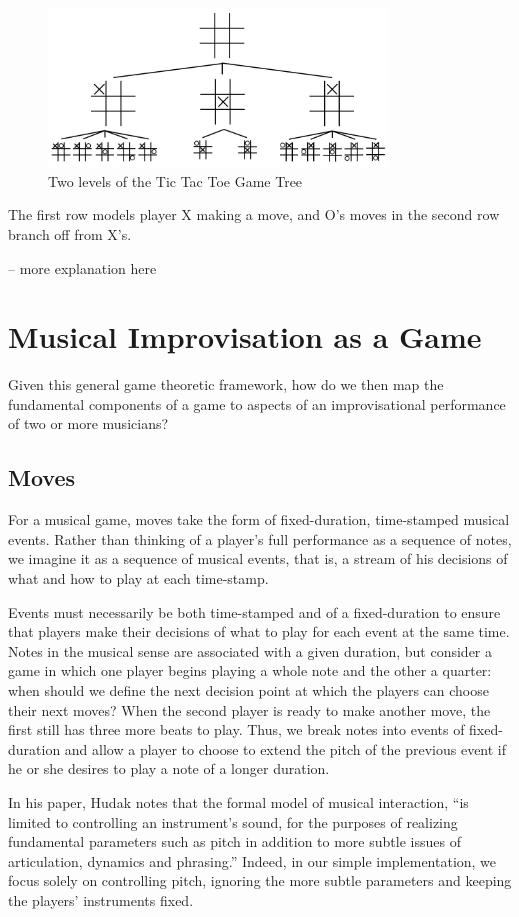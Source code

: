 \documentclass{article}
\begin{document}
\begin{figure}
\centering
\includegraphics[width=90mm]{ttt.jpg}
\caption{Two levels of the Tic Tac Toe Game Tree}
\end{figure}

The first row models player X making a move, and O's moves in the second
row branch off from X's.

-- more explanation here

\section{Musical Improvisation as a
Game}

Given this general game theoretic framework, how do we then map the
fundamental components of a game to aspects of an improvisational
performance of two or more musicians?

\subsection{Moves}
For a musical game, moves take the form of fixed-duration, time-stamped
musical events. Rather than thinking of a player's full performance as a
sequence of notes, we imagine it as a sequence of musical events, that
is, a stream of his decisions of what and how to play at each
time-stamp.

Events must necessarily be both time-stamped and of a fixed-duration to
ensure that players make their decisions of what to play for each event
at the same time. Notes in the musical sense are associated with a given
duration, but consider a game in which one player begins playing a whole
note and the other a quarter: when should we define the next decision
point at which the players can choose their next moves? When the second
player is ready to make another move, the first still has three more
beats to play. Thus, we break notes into events of fixed-duration and
allow a player to choose to extend the pitch of the previous event if he
or she desires to play a note of a longer duration.

In his paper, Hudak notes that the formal model of musical interaction,
``is limited to controlling an instrument's sound, for the purposes of
realizing fundamental parameters such as pitch in addition to more
subtle issues of articulation, dynamics and phrasing.'' Indeed, in our
simple implementation, we focus solely on controlling pitch, ignoring
the more subtle parameters and keeping the players' instruments fixed.
\end{document}
